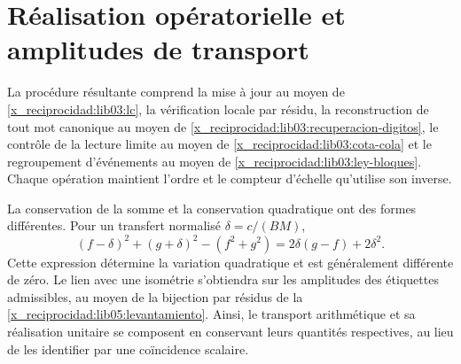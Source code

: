 \section{Réalisation opératorielle et amplitudes de transport}
\label{x_reciprocidad:lib03:operativo}

La procédure résultante comprend la mise à jour au moyen de \eqref{x_reciprocidad:lib03:lc}, la vérification locale par résidu, la reconstruction de tout mot canonique au moyen de \eqref{x_reciprocidad:lib03:recuperacion-digitos}, le contrôle de la lecture limite au moyen de \eqref{x_reciprocidad:lib03:cota-cola} et le regroupement d'événements au moyen de \eqref{x_reciprocidad:lib03:ley-bloques}. Chaque opération maintient l'ordre et le compteur d'échelle qu'utilise son inverse.

La conservation de la somme et la conservation quadratique ont des formes
différentes. Pour un transfert normalisé
\(\delta=c/(BM)\),
\begin{equation}
 (f-\delta)^2+(g+\delta)^2-(f^2+g^2)
 =2\delta(g-f)+2\delta^2.
 \label{x_reciprocidad:lib03:variacion-cuadratica}
\end{equation}
Cette expression détermine la variation quadratique et est généralement
différente de zéro. Le lien avec une isométrie s’obtiendra sur les
amplitudes des étiquettes admissibles, au moyen de la bijection par
résidus de la \cref{x_reciprocidad:lib05:levantamiento}. Ainsi, le transport arithmétique
et sa réalisation unitaire se composent en conservant leurs quantités
respectives, au lieu de les identifier par une coïncidence scalaire.
